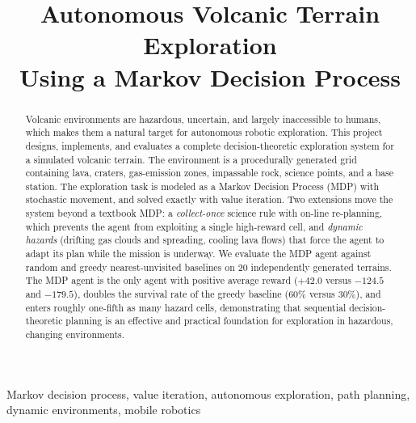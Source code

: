 \documentclass[conference]{IEEEtran}
\begin{document}
\title{Autonomous Volcanic Terrain Exploration\\Using a Markov Decision Process}
\author{
}

\maketitle

\begin{abstract}
Volcanic environments are hazardous, uncertain, and largely inaccessible to humans, which makes them a natural target for autonomous robotic exploration. This project designs, implements, and evaluates a complete decision-theoretic exploration system for a simulated volcanic terrain. The environment is a procedurally generated grid containing lava, craters, gas-emission zones, impassable rock, science points, and a base station. The exploration task is modeled as a Markov Decision Process (MDP) with stochastic movement, and solved exactly with value iteration. Two extensions move the system beyond a textbook MDP: a \emph{collect-once} science rule with on-line re-planning, which prevents the agent from exploiting a single high-reward cell, and \emph{dynamic hazards} (drifting gas clouds and spreading, cooling lava flows) that force the agent to adapt its plan while the mission is underway. We evaluate the MDP agent against random and greedy nearest-unvisited baselines on 20 independently generated terrains. The MDP agent is the only agent with positive average reward ($+42.0$ versus $-124.5$ and $-179.5$), doubles the survival rate of the greedy baseline (60\% versus 30\%), and enters roughly one-fifth as many hazard cells, demonstrating that sequential decision-theoretic planning is an effective and practical foundation for exploration in hazardous, changing environments.
\end{abstract}

\begin{IEEEkeywords}
Markov decision process, value iteration, autonomous exploration, path planning, dynamic environments, mobile robotics
\end{IEEEkeywords}
\end{document}
